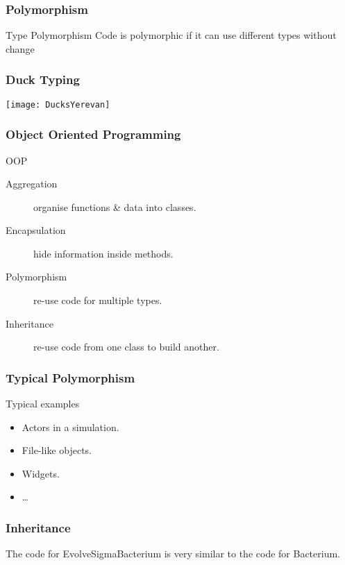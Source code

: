 \begin{frame}[fragile] 
\frametitle{Polymorphism}

\begin{block}{Type Polymorphism}
Code is \alert{polymorphic} if it can use different types without change
\end{block}
\end{frame}

\begin{frame}[fragile]
\frametitle{Duck Typing}

\centering
\texttt{[image: DucksYerevan]} %

\end{frame}



\begin{frame}[fragile] 
\frametitle{Object Oriented Programming}

\begin{block}{OOP}
\begin{description}
\item[\alert{Aggregation}] organise functions \& data into classes.
\item[\alert{Encapsulation}] hide information inside methods.
\item[\alert{Polymorphism}] re-use code for multiple types.
\item[Inheritance] re-use code from one class to build another.
\end{description}
\end{block}
\end{frame}

\begin{frame}[fragile]
\frametitle{Typical Polymorphism}
\begin{block}{Typical examples}
\begin{itemize}
\item Actors in a simulation.
\item File-like objects.
\item Widgets.
\item \ldots
\end{itemize}
\end{block}
\end{frame}

\begin{frame}[fragile]
\frametitle{Inheritance}

The code for EvolveSigmaBacterium is very similar to the code for Bacterium.

\end{frame}

